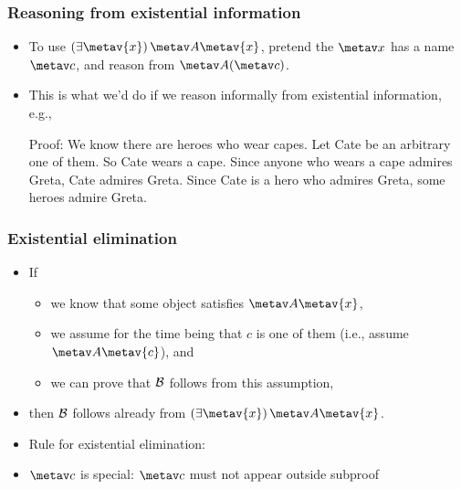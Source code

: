 \begin{frame}
  \frametitle{Reasoning from existential information}

  \begin{itemize}
    \item To use $\qt{\exists}{\metav{x}}\,\metav A\qv{\metav{x}}$, pretend the
    $\metav x$ has a name~$\metav c$, and reason from $\metav A(\metav
    c)$.
    \item This is what we'd do if we reason informally from existential information, e.g.,

\pause
Proof: We know there are heroes who wear capes. Let Cate be an
arbitrary one of them.  So Cate wears a cape. Since anyone who wears a
cape admires Greta, Cate admires Greta. Since Cate is a hero who
admires Greta, some heroes admire Greta.
\end{itemize}

\end{frame}

\begin{frame}
\frametitle{Existential elimination}

\begin{itemize}[<+->]
  \item If
  \begin{itemize}[<+->]
    \item we know that some object satisfies $\metav A\qv{\metav{x}}$,
    \item we assume for the time being that $c$ is one of them (i.e.,
  assume $\metav A\qv{\metav{c}}$), and
    \item we can prove that $\mathcal{B}$ follows from this assumption,
\end{itemize}
\item[] then $\mathcal{B}$ follows already from $\qt{\exists}{\metav{x}}\, \metav A\qv{\metav{x}}$.
\item Rule for existential elimination:

\begin{fitchproof}
  \open
\close
{}
\end{fitchproof}
\item $\metav c$ is special: $\metav c$ must not appear outside subproof
\end{itemize}
\end{frame}

